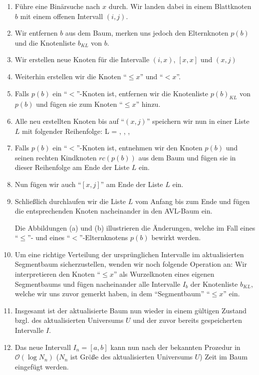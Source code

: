 \documentclass[a4paper]{article}
\newcommand*\circled[1]{\tikz[baseline=(char.base)]{
            \node[shape=circle,draw,inner sep=2pt] (char) {#1};}}
\begin{document}
\begin{itemize}
\begin{itemize}
     \begin{enumerate}
     	\item Führe eine Binärsuche nach $x$ durch. Wir landen dabei in einem Blattknoten $b$
     	mit einem offenen Intervall $(i,j)$. 
     	\item Wir entfernen $b$ aus dem Baum, merken uns jedoch den Elternknoten $p(b)$ 
     	und die Knotenliste $b_{KL}$ von $b$.
     	\item Wir erstellen neue Knoten für die Intervalle $(i,x)$, $[x,x]$ und $(x,j)$
     	\item Weiterhin erstellen wir die Knoten "`$\leq x$"' und "`$< x$"'.
     	\item Falls $p(b)$ ein "`$<$"'-Knoten ist, entfernen wir die Knotenliste $p(b)_{KL}$ von $p(b)$
     	und fügen sie zum Knoten "`$\leq x$"' hinzu.
     	\item Alle neu erstellten Knoten bis auf "`$(x,j)$"' speichern wir nun in einer Liste $L$ mit folgender Reihenfolge:
     	L = \circled{$\leq x$}, \circled{$< x$}, \circled{$(i,x)$}, \circled{$[x,x]$}
     	\item Falls $p(b)$ ein "`$<$"'-Knoten ist, entnehmen 
     	wir den Knoten $p(b)$ und seinen rechten Kindknoten $rc(p(b))$ aus dem Baum und fügen sie
     	in dieser Reihenfolge am Ende der Liste $L$ ein. 
     	\item Nun fügen wir auch "`$[x,j]$"' am Ende der Liste $L$ ein.
     	\item Schließlich durchlaufen wir die Liste $L$ vom Anfang bis zum Ende und fügen 
     	die entsprechenden Knoten nacheinander in den AVL-Baum ein. 
     	
     	Die Abbildungen (a) und (b) illustrieren die Änderungen, welche im Fall eines "`$\leq$"'- 
     	und eines "`$<$"'-Elternknotens $p(b)$ bewirkt werden.
     	
     	\item Um eine richtige Verteilung der ursprünglichen Intervalle im aktualisierten
     	Segmentbaum sicherzustellen, wenden wir noch folgende Operation an: 
     	Wir interpretieren den Knoten "`$\leq x$"' als Wurzelknoten eines eigenen Segmentbaums und
     	fügen nacheinander alle Intervalle $I_b$ der Knotenliste $b_{KL}$, welche wir uns zuvor gemerkt haben, in dem "`Segmentbaum"' "`$\leq x$"' ein.
     	\item Insgesamt ist der aktualisierte Baum nun wieder in einem gültigen Zustand bzgl. des 
     	aktualisierten Universums $U$ und der zuvor bereits gespeicherten Intervalle $I$.
     	\item Das neue Intervall $I_n = [a,b]$ kann nun nach der bekannten Prozedur 
     	in $\mathcal{O}(\log N_n)$ ($N_n$ ist Größe des aktualisierten Universums $U$) Zeit im Baum eingefügt werden.


\end{enumerate}
\end{itemize}
\end{itemize}
\end{document}

